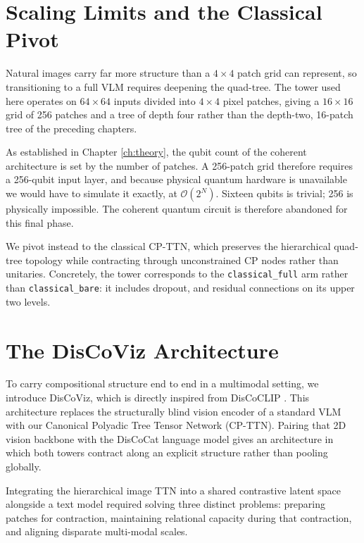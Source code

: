 \documentclass[12pt, a4paper, oneside]{report}
\begin{document}
\section{Scaling Limits and the Classical Pivot}

Natural images carry far more structure than a $4 \times 4$ patch grid can represent, so transitioning to a full VLM requires deepening the quad-tree. The tower used here operates on $64 \times 64$ inputs divided into $4 \times 4$ pixel patches, giving a $16 \times 16$ grid of 256 patches and a tree of depth four rather than the depth-two, 16-patch tree of the preceding chapters.

As established in Chapter \ref{ch:theory}, the qubit count of the coherent architecture is set by the number of patches. A 256-patch grid therefore requires a 256-qubit input layer, and because physical quantum hardware is unavailable we would have to simulate it exactly, at $\mathcal{O}(2^N)$. Sixteen qubits is trivial; 256 is physically impossible. The coherent quantum circuit is therefore abandoned for this final phase.

We pivot instead to the classical CP-TTN, which preserves the hierarchical quad-tree topology while contracting through unconstrained CP nodes rather than unitaries. Concretely, the tower corresponds to the \texttt{classical\_full} arm rather than \texttt{classical\_bare}: it includes dropout, and residual connections on its upper two levels.

\section{The DisCoViz Architecture}

To carry compositional structure end to end in a multimodal setting, we introduce DisCoViz, which is directly inspired from DisCoCLIP \cite{discoclip}. This architecture replaces the structurally blind vision encoder of a standard VLM with our Canonical Polyadic Tree Tensor Network (CP-TTN). Pairing that 2D vision backbone with the DisCoCat language model \cite{discocat} gives an architecture in which both towers contract along an explicit structure rather than pooling globally.

Integrating the hierarchical image TTN into a shared contrastive latent space alongside a text model required solving three distinct problems: preparing patches for contraction, maintaining relational capacity during that contraction, and aligning disparate multi-modal scales.
\end{document}
